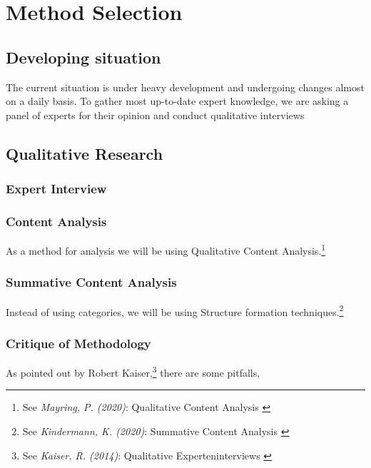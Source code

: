 %
%

\pagebreak
\section{Method Selection}

\onehalfspacing

\subsection{Developing situation}

The current situation is under heavy development and undergoing changes almost on a daily basis. To gather most up-to-date expert knowledge, we are asking a panel of experts for their opinion and conduct qualitative interviews

\subsection{Qualitative Research}

\subsubsection{Expert Interview}

\subsubsection{Content Analysis}

As a method for analysis we will be using Qualitative Content Analysis.\footnote{See \textit{Mayring, P. (2020)}: Qualitative Content Analysis \cite{qualiContent}}

\subsubsection{Summative Content Analysis} 

Instead of using categories, we will be using Structure formation techniques.\footnote{See \textit{Kindermann, K. (2020)}: Summative Content Analysis \cite{summaContent}}

\subsubsection{Critique of Methodology}

As pointed out by Robert Kaiser,\footnote{See \textit{Kaiser, R. (2014)}: Qualitative Experteninterviews \cite{expertInterviews}} there are some pitfalls,

